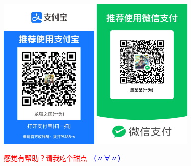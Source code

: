 \noindent\begin{minipage}[c]{\textwidth}
    \centering
    \includegraphics[height=7.5cm]{resources/pay/Ali_Pay.jpg}\qquad%
    \includegraphics[height=7.5cm]{resources/pay/Wechat_Pay.jpg}

    \textcolor{red}{感觉有帮助？请我吃个甜点} \textcolor{blue}{（〃∀〃）}
\end{minipage}
